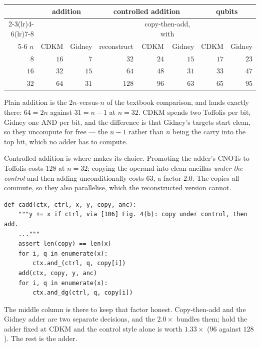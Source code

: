 \documentclass[11pt]{article}
\theoremstyle{plain}
\theoremstyle{remark}
\begin{document}
\begin{center}\small
\begin{tabular}{@{}rrrrrrrr@{}}
\toprule
& \multicolumn{2}{c}{addition} & \multicolumn{3}{c}{controlled addition} & \multicolumn{2}{c}{qubits}\\
\cmidrule(lr){2-3}\cmidrule(lr){4-6}\cmidrule(lr){7-8}
& & & & \multicolumn{2}{c}{copy-then-add, with} & & \\
\cmidrule(lr){5-6}
$n$ & CDKM & Gidney & reconstruct & CDKM & Gidney & CDKM & Gidney\\
\midrule
$8$ & $16$ & $7$ & $32$ & $24$ & $15$ & $17$ & $23$\\
$16$ & $32$ & $15$ & $64$ & $48$ & $31$ & $33$ & $47$\\
$32$ & $64$ & $31$ & $128$ & $96$ & $63$ & $65$ & $95$\\
\bottomrule
\end{tabular}
\end{center}

\noindent
Plain addition is the $2n$-versus-$n$ of the textbook comparison, and lands exactly there:
$64=2n$ against $31=n-1$ at $n=32$. CDKM spends two Toffolis per bit, Gidney one AND
per bit, and the difference is that Gidney's targets start clean, so they uncompute for free --- the
$n-1$ rather than $n$ being the carry into the top bit, which no adder has to compute.

Controlled addition is where \cite{ec:kim26} makes its choice. Promoting the adder's CNOTs to
Toffolis costs $128$ at $n=32$; copying the operand into clean ancillas \emph{under the
control} and then adding unconditionally costs $63$, a factor $2.0$. The copies
all commute, so they also parallelise, which the reconstructed version cannot.

\begin{lstlisting}
def cadd(ctx, ctrl, x, y, copy, anc):
    """y += x if ctrl, via [106] Fig. 4(b): copy under control, then add.
    ..."""
    assert len(copy) == len(x)
    for i, q in enumerate(x):
        ctx.and_(ctrl, q, copy[i])
    add(ctx, copy, y, anc)
    for i, q in enumerate(x):
        ctx.and_dg(ctrl, q, copy[i])
\end{lstlisting}

\noindent
The middle column is there to keep that factor honest. Copy-then-add and the Gidney adder are two
separate decisions, and the $2.0\times$ bundles them; hold the adder fixed at CDKM and
the control style alone is worth $1.33\times$ ($96$ against $128$).
The rest is the adder.
\end{document}
